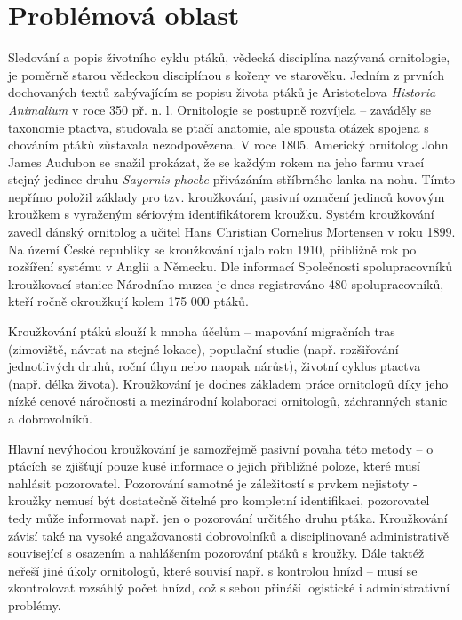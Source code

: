 
\chapter{Problémová oblast}{\tiny }


Sledování a popis životního cyklu ptáků, vědecká disciplína nazývaná ornitologie, je poměrně starou vědeckou disciplínou s kořeny  ve starověku. Jedním z prvních dochovaných textů zabývajícím se popisu života ptáků je Aristotelova \emph{Historia Animalium} v roce 350 př. n. l. Ornitologie se postupně rozvíjela -- zaváděly se taxonomie ptactva, studovala se ptačí anatomie, ale spousta otázek spojena s chováním ptáků zůstavala nezodpovězena. V roce 1805. Americký ornitolog John James Audubon se snažil prokázat, že se každým rokem na jeho farmu vrací stejný jedinec druhu \emph{Sayornis phoebe} přivázáním stříbrného lanka na nohu. Tímto nepřímo položil základy pro tzv. kroužkování, pasivní označení jedinců kovovým kroužkem s vyraženým sériovým identifikátorem kroužku. Systém kroužkování zavedl dánský ornitolog a učitel Hans Christian Cornelius Mortensen v roku 1899. Na území České republiky se kroužkování ujalo roku 1910, přibližně rok po rozšíření systému v Anglii a Německu. Dle informací Společnosti spolupracovníků kroužkovací stanice Národního muzea je dnes registrováno 480 spolupracovníků, kteří ročně okroužkují kolem 175 000 ptáků.

Kroužkování ptáků slouží k mnoha účelům -- mapování migračních tras (zimoviště, návrat na stejné lokace), populační studie (např. rozšiřování jednotlivých druhů, roční úhyn nebo naopak nárůst), životní cyklus ptactva (např. délka života). Kroužkování je dodnes základem práce ornitologů díky jeho nízké cenové náročnosti a mezinárodní kolaboraci ornitologů, záchranných stanic a dobrovolníků. %

Hlavní nevýhodou kroužkování je samozřejmě pasivní povaha této metody -- o ptácích se zjišťují pouze kusé informace o jejich přibližné poloze, které musí nahlásit pozorovatel. Pozorování samotné je záležitostí s prvkem nejistoty - kroužky nemusí být dostatečně čitelné pro kompletní identifikaci, pozorovatel tedy může informovat např. jen o pozorování určitého druhu ptáka. Kroužkování závisí také na vysoké angažovanosti dobrovolníků a disciplinované administrativě související s osazením a nahlášením pozorování ptáků s kroužky. Dále taktéž neřeší jiné úkoly ornitologů, které souvisí např. s kontrolou hnízd -- musí se zkontrolovat rozsáhlý počet hnízd, což s sebou přináší logistické i administrativní problémy.

